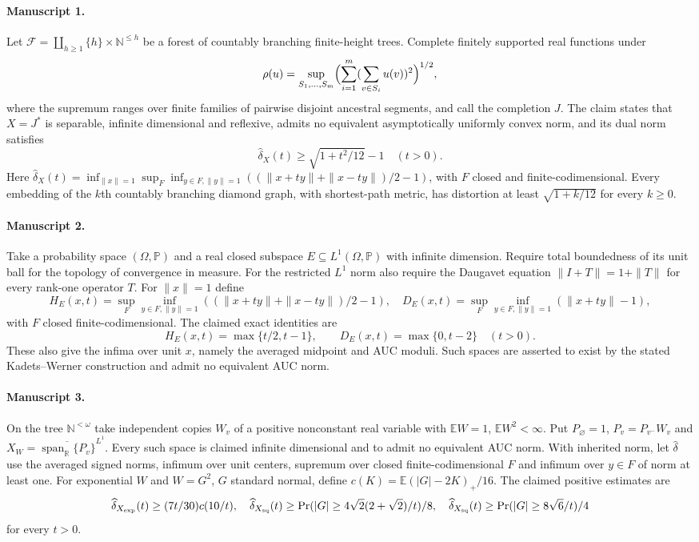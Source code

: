 \documentclass[11pt]{article}
\begin{document}
\paragraph{Manuscript 1.}
Let $\mathcal F=\coprod_{h\ge1}\{h\}\times\mathbb N^{\le h}$ be a forest of countably branching finite-height trees. Complete finitely supported real functions under
\[
 \rho(u)=\sup_{S_1,\ldots,S_m}\Bigl(\sum_{i=1}^m(\sum_{v\in S_i}u(v))^2\Bigr)^{1/2},
\]
where the supremum ranges over finite families of pairwise disjoint ancestral segments, and call the completion $J$. The claim states that $X=J^*$ is separable, infinite dimensional and reflexive, admits no equivalent asymptotically uniformly convex norm, and its dual norm satisfies
\[
 \widehat\delta_X(t)\ge\sqrt{1+t^2/12}-1\quad(t>0).
\]
Here $\widehat\delta_X(t)=\inf_{\|x\|=1}\sup_F\inf_{y\in F,\|y\|=1}((\|x+ty\|+\|x-ty\|)/2-1)$, with $F$ closed and finite-codimensional. Every embedding of the $k$th countably branching diamond graph, with shortest-path metric, has distortion at least $\sqrt{1+k/12}$ for every $k\ge0$.

\paragraph{Manuscript 2.}
Take a probability space $(\Omega,\mathbb P)$ and a real closed subspace $E\subseteq L^1(\Omega,\mathbb P)$ with infinite dimension. Require total boundedness of its unit ball for the topology of convergence in measure. For the restricted $L^1$ norm also require the Daugavet equation $\|I+T\|=1+\|T\|$ for every rank-one operator $T$. For $\|x\|=1$ define
\[
 H_E(x,t)=\sup_F\inf_{y\in F,\|y\|=1}((\|x+ty\|+\|x-ty\|)/2-1),
 \quad D_E(x,t)=\sup_F\inf_{y\in F,\|y\|=1}(\|x+ty\|-1),
\]
with $F$ closed finite-codimensional. The claimed exact identities are
\[
 H_E(x,t)=\max\{t/2,t-1\},\qquad D_E(x,t)=\max\{0,t-2\}\quad(t>0).
\]
These also give the infima over unit $x$, namely the averaged midpoint and AUC moduli. Such spaces are asserted to exist by the stated Kadets--Werner construction and admit no equivalent AUC norm.

\paragraph{Manuscript 3.}
On the tree $\mathbb N^{<\omega}$ take independent copies $W_v$ of a positive nonconstant real variable with $\mathbb EW=1$, $\mathbb EW^2<\infty$. Put $P_{\varnothing}=1$, $P_v=P_{v^-}W_v$ and $X_W=\overline{\operatorname{span}_{\mathbb R}\{P_v\}}^{L^1}$. Every such space is claimed infinite dimensional and to admit no equivalent AUC norm. With inherited norm, let $\widehat\delta$ use the averaged signed norms, infimum over unit centers, supremum over closed finite-codimensional $F$ and infimum over $y\in F$ of norm at least one. For exponential $W$ and $W=G^2$, $G$ standard normal, define $c(K)=\mathbb E(|G|-2K)_+/16$. The claimed positive estimates are
\[
 \widehat\delta_{X_{\rm exp}}(t)\ge(7t/30)c(10/t),\quad
 \widehat\delta_{X_{\rm sq}}(t)\ge\Pr(|G|\ge4\sqrt2(2+\sqrt2)/t)/8,
 \quad\widehat\delta_{X_{\rm sq}}(t)\ge\Pr(|G|\ge8\sqrt6/t)/4
\]
for every $t>0$.
\end{document}
